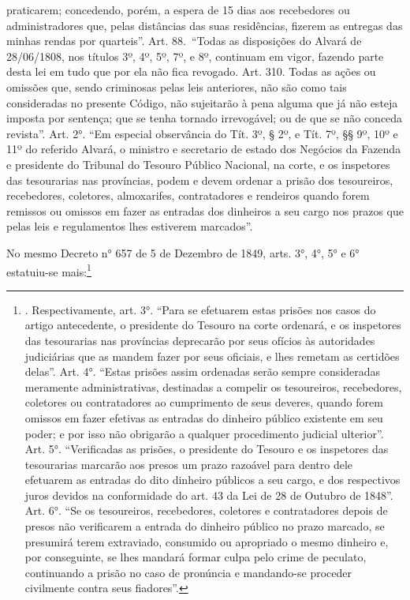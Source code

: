 {  praticarem; concedendo, porém, a espera de 15 dias aos recebedores ou
  administradores que, pelas distâncias das suas residências, fizerem as
  entregas das minhas rendas por quarteis''. Art. 88.~``Todas as
  disposições do Alvará de 28/06/1808, nos títulos 3º, 4º, 5º, 7º, e 8º,
  continuam em vigor, fazendo parte desta lei em tudo que por ela não
  fica revogado. Art. 310. Todas as ações ou omissões que, sendo
  criminosas pelas leis anteriores, não são como tais consideradas no
  presente Código, não sujeitarão à pena alguma que já não esteja
  imposta por sentença; que se tenha tornado irrevogável; ou de que se
  não conceda revista''. Art. 2°. ``Em especial observância do Tít. 3º,
  § 2º, e Tít. 7º, §§ 9º, 10º e 11º do referido Alvará, o ministro e
  secretario de estado dos Negócios da Fazenda e presidente do Tribunal
  do Tesouro Público Nacional, na corte, e os inspetores das tesourarias
  nas províncias, podem e devem ordenar a prisão dos tesoureiros,
  recebedores, coletores, almoxarifes, contratadores e rendeiros quando
  forem remissos ou omissos em fazer as entradas dos dinheiros a seu
  cargo nos prazos que pelas leis e regulamentos lhes estiverem
  marcados''.}

No mesmo Decreto n° 657 de 5 de Dezembro de 1849, arts. 3°, 4°, 5° e 6°
estatuiu-se mais:\footnote{. Respectivamente, art. 3°. ``Para se
  efetuarem estas prisões nos casos do artigo antecedente, o presidente
  do Tesouro na corte ordenará, e os inspetores das tesourarias nas
  províncias deprecarão por seus ofícios às autoridades judiciárias que
  as mandem fazer por seus oficiais, e lhes remetam as certidões
  delas''. Art. 4°. ``Estas prisões assim ordenadas serão sempre
  consideradas meramente administrativas, destinadas a compelir os
  tesoureiros, recebedores, coletores ou contratadores ao cumprimento de
  seus deveres, quando forem omissos em fazer efetivas as entradas do
  dinheiro público existente em seu poder; e por isso não obrigarão a
  qualquer procedimento judicial ulterior''. Art. 5°. ``Verificadas as
  prisões, o presidente do Tesouro e os inspetores das tesourarias
  marcarão aos presos um prazo razoável para dentro dele efetuarem as
  entradas do dito dinheiro públicos a seu cargo, e dos respectivos
  juros devidos na conformidade do art. 43 da Lei de 28 de Outubro de
  1848''. Art. 6°. ``Se os tesoureiros, recebedores, coletores e
  contratadores depois de presos não verificarem a entrada do dinheiro
  público no prazo marcado, se presumirá terem extraviado, consumido ou
  apropriado o mesmo dinheiro e, por conseguinte, se lhes mandará formar
  culpa pelo crime de peculato, continuando a prisão no caso de
  pronúncia e mandando-se proceder civilmente contra seus fiadores''.}

